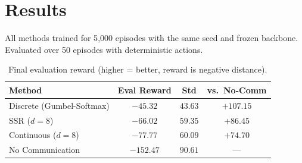 \documentclass[11pt,a4paper]{article}
\begin{document}
\section{Results}

All methods trained for 5{,}000 episodes with the same seed and frozen backbone. Evaluated over 50 episodes with deterministic actions.

\begin{table}[h]
\centering
\caption{Final evaluation reward (higher = better, reward is negative distance).}
\vspace{0.3em}
\begin{tabular}{@{}lccc@{}}
\toprule
\textbf{Method} & \textbf{Eval Reward} & \textbf{Std} & \textbf{vs.\ No-Comm} \\
\midrule
Discrete (Gumbel-Softmax) & $\mathbf{-45.32}$ & $43.63$ & $+107.15$ \\
SSR ($d{=}8$)              & $-66.02$          & $59.35$ & $+86.45$ \\
Continuous ($d{=}8$)       & $-77.77$          & $60.09$ & $+74.70$ \\
No Communication           & $-152.47$         & $90.61$ & --- \\
\bottomrule
\end{tabular}
\end{table}
\end{document}
